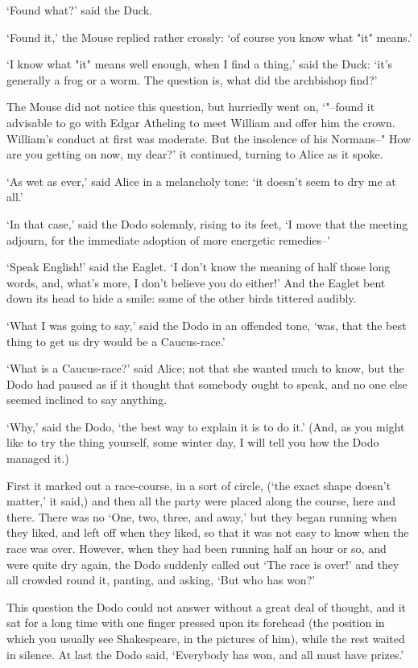 \documentclass{article}
\begin{document}
`Found what?' said the Duck.

`Found it,' the Mouse replied rather crossly: `of course you know what "it" means.'

`I know what "it" means well enough, when I find a thing,' said the Duck: `it's generally a frog or a worm. The question is, what did the archbishop find?'

The Mouse did not notice this question, but hurriedly went on, `"--found it advisable to go with Edgar Atheling to meet William and offer him the crown. William's conduct at first was moderate. But the insolence of his Normans--" How are you getting on now, my dear?' it continued, turning to Alice as it spoke.

`As wet as ever,' said Alice in a melancholy tone: `it doesn't seem to dry me at all.'

`In that case,' said the Dodo solemnly, rising to its feet, `I move that the meeting adjourn, for the immediate adoption of more energetic remedies--'

`Speak English!' said the Eaglet. `I don't know the meaning of half those long words, and, what's more, I don't believe you do either!' And the Eaglet bent down its head to hide a smile: some of the other birds tittered audibly.

`What I was going to say,' said the Dodo in an offended tone, `was, that the best thing to get us dry would be a Caucus-race.'

`What is a Caucus-race?' said Alice; not that she wanted much to know, but the Dodo had paused as if it thought that somebody ought to speak, and no one else seemed inclined to say anything.

`Why,' said the Dodo, `the best way to explain it is to do it.' (And, as you might like to try the thing yourself, some winter day, I will tell you how the Dodo managed it.)

First it marked out a race-course, in a sort of circle, (`the exact shape doesn't matter,' it said,) and then all the party were placed along the course, here and there. There was no `One, two, three, and away,' but they began running when they liked, and left off when they liked, so that it was not easy to know when the race was over. However, when they had been running half an hour or so, and were quite dry again, the Dodo suddenly called out `The race is over!' and they all crowded round it, panting, and asking, `But who has won?'

This question the Dodo could not answer without a great deal of thought, and it sat for a long time with one finger pressed upon its forehead (the position in which you usually see Shakespeare, in the pictures of him), while the rest waited in silence. At last the Dodo said, `Everybody has won, and all must have prizes.'
\end{document}
